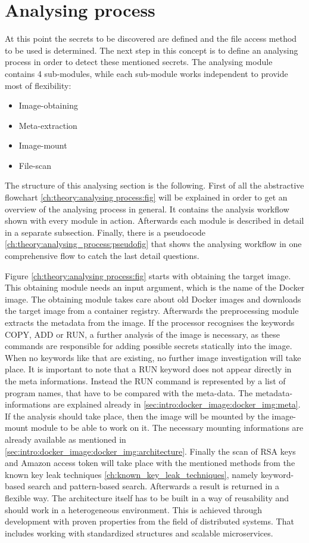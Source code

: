 \section{Analysing process}
\label{ch:theory:analysing_process}
At this point the secrets to be discovered are defined and the file access method to be used is determined. The next step in this concept is to define an analysing process in order to detect these mentioned secrets.
The analysing module contains 4 sub-modules, while each sub-module works independent to provide most of flexibility:
\begin{itemize}
\item Image-obtaining
\item Meta-extraction
\item Image-mount
\item File-scan
\end{itemize}

The structure of this analysing section is the following. First of all the abstractive flowchart \ref{ch:theory:analysing process:fig} will be explained in order to get an overview of the analysing process in general. It contains the analysis workflow shown with every module in action. Afterwards each module is described in detail in a separate subsection.
Finally, there is a pseudocode \ref{ch:theory:analysing_process:pseudofig} that shows the analysing workflow in one comprehensive flow to catch the last detail questions.

Figure \ref{ch:theory:analysing process:fig} starts with obtaining the target image. This obtaining module needs an input argument, which is the name of the Docker image.
The obtaining module takes care about old Docker images and downloads the target image from a container registry. Afterwards the preprocessing module extracts the metadata from the image. If the processor recognises the keywords COPY, ADD or RUN, a further analysis of the image is necessary, as these commands are responsible for adding possible secrets statically into the image. When no keywords like that are existing, no further image investigation will take place. It is important to note that a RUN keyword does not appear directly in the meta informations. Instead the RUN command is represented by a list of program names, that have to be compared with the meta-data. The metadata-informations are explained already in \ref{sec:intro:docker_image:docker_img:meta}. If the analysis should take place, then the image will be mounted by the image-mount module to be able to work on it. The necessary mounting informations are already available as mentioned in \ref{sec:intro:docker_image:docker_img:architecture}. Finally the scan of RSA keys and Amazon access token will take place with the mentioned methods from the known key leak techniques \ref{ch:known_key_leak_techniques}, namely keyword-based search and pattern-based search. Afterwards a result is returned in a flexible way.
The architecture itself has to be built in a way of reusability and should work in a heterogeneous environment. This is achieved through development with proven properties from the field of distributed systems. That includes working with standardized structures and scalable microservices.

